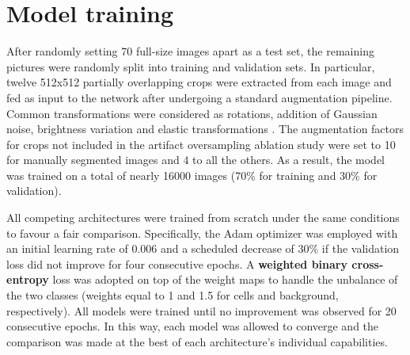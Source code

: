 

\section{Model training}
\label{sec:model_training}
After randomly setting 70 full-size images apart as a test set, the remaining pictures were randomly split into training and validation sets. 
In particular, twelve 512x512 partially overlapping crops were extracted from each image and fed as input to the network after undergoing a standard augmentation pipeline. Common transformations were considered as rotations, addition of Gaussian noise, brightness variation and elastic transformations \cite{elastic_tranformation}. 
The augmentation factors for crops not included in the artifact oversampling ablation study were set to 10 for manually segmented images and 4 to all the others.
As a result, the model was trained on a total of nearly 16000 images (70\% for training and 30\% for validation).

All competing architectures were trained from scratch under the same conditions to favour a fair comparison.
Specifically, the Adam \cite{adam} optimizer was employed with an initial learning rate of 0.006 and a scheduled decrease of 30\% if the validation loss did not improve for four consecutive epochs. 
A \textbf{weighted binary cross-entropy} loss was adopted on top of the weight maps to handle the unbalance of the two classes (weights equal to 1 and 1.5 for cells and background, respectively).
All models were trained until no improvement was observed for 20 consecutive epochs. In this way, each model was allowed to converge and the comparison was made at the best of each architecture's individual capabilities.

